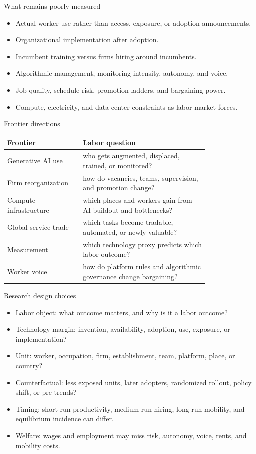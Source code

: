\documentclass[aspectratio=169,11pt]{beamer}
\begin{document}
\begin{frame}{What remains poorly measured}
\begin{itemize}
    \item Actual worker use rather than access, exposure, or adoption announcements.
    \item Organizational implementation after adoption.
    \item Incumbent training versus firms hiring around incumbents.
    \item Algorithmic management, monitoring intensity, autonomy, and voice.
    \item Job quality, schedule risk, promotion ladders, and bargaining power.
    \item Compute, electricity, and data-center constraints as labor-market forces.
\end{itemize}
\end{frame}

\begin{frame}{Frontier directions}
\small
\begin{tabular}{p{0.30\linewidth} p{0.50\linewidth}}
\toprule
Frontier & Labor question \\
\midrule
Generative AI use & who gets augmented, displaced, trained, or monitored? \\
Firm reorganization & how do vacancies, teams, supervision, and promotion change? \\
Compute infrastructure & which places and workers gain from AI buildout and bottlenecks? \\
Global service trade & which tasks become tradable, automated, or newly valuable? \\
Measurement & which technology proxy predicts which labor outcome? \\
Worker voice & how do platform rules and algorithmic governance change bargaining? \\
\bottomrule
\end{tabular}
\end{frame}

\begin{frame}{Research design choices}
\begin{itemize}
    \item Labor object: what outcome matters, and why is it a labor outcome?
    \item Technology margin: invention, availability, adoption, use, exposure, or implementation?
    \item Unit: worker, occupation, firm, establishment, team, platform, place, or country?
    \item Counterfactual: less exposed units, later adopters, randomized rollout, policy shift, or pre-trends?
    \item Timing: short-run productivity, medium-run hiring, long-run mobility, and equilibrium incidence can differ.
    \item Welfare: wages and employment may miss risk, autonomy, voice, rents, and mobility costs.
\end{itemize}
\end{frame}
\end{document}
